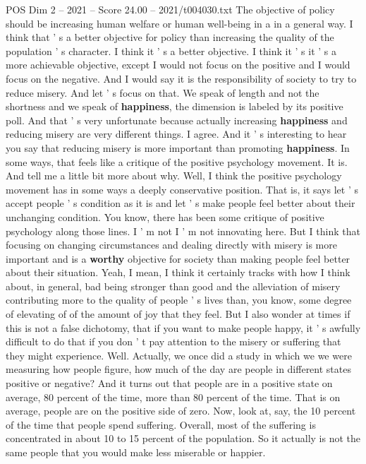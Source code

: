 \begin{textsample}{POS Dim 2 – 2021 – Score 24.00 – 2021/t004030.txt}
The objective of policy should be increasing human welfare or human well-being in a in a general way.
I think that ' s a better objective for policy than increasing the quality of the population ' s character.
I think it ' s a better objective.
I think it ' s it ' s a more achievable objective, except I would not focus on the positive and I would focus on the negative.
And I would say it is the responsibility of society to try to reduce misery.
And let ' s focus on that.
We speak of length and not the shortness and we speak of \textbf{happiness}, the dimension is labeled by its positive poll.
And that ' s very unfortunate because actually increasing \textbf{happiness} and reducing misery are very different things.
I agree.
And it ' s interesting to hear you say that reducing misery is more important than promoting \textbf{happiness}.
In some ways, that feels like a critique of the positive psychology movement.
It is.
And tell me a little bit more about why.
Well, I think the positive psychology movement has in some ways a deeply conservative position.
That is, it says let ' s accept people ' s condition as it is and let ' s make people feel better about their unchanging condition.
You know, there has been some critique of positive psychology along those lines.
I ' m not I ' m not innovating here.
But I think that focusing on changing circumstances and dealing directly with misery is more important and is a \textbf{worthy} objective for society than making people feel better about their situation.
Yeah, I mean, I think it certainly tracks with how I think about, in general, bad being stronger than good and the alleviation of misery contributing more to the quality of people ' s lives than, you know, some degree of elevating of of the amount of joy that they feel.
But I also wonder at times if this is not a false dichotomy, that if you want to make people happy, it ' s awfully difficult to do that if you don ' t pay attention to the misery or suffering that they might experience.
Well.
Actually, we once did a study in which we we were measuring how people figure, how much of the day are people in different states positive or negative?
And it turns out that people are in a positive state on average, 80 percent of the time, more than 80 percent of the time.
That is on average, people are on the positive side of zero.
Now, look at, say, the 10 percent of the time that people spend suffering.
Overall, most of the suffering is concentrated in about 10 to 15 percent of the population.
So it actually is not the same people that you would make less miserable or happier.

\end{textsample}
